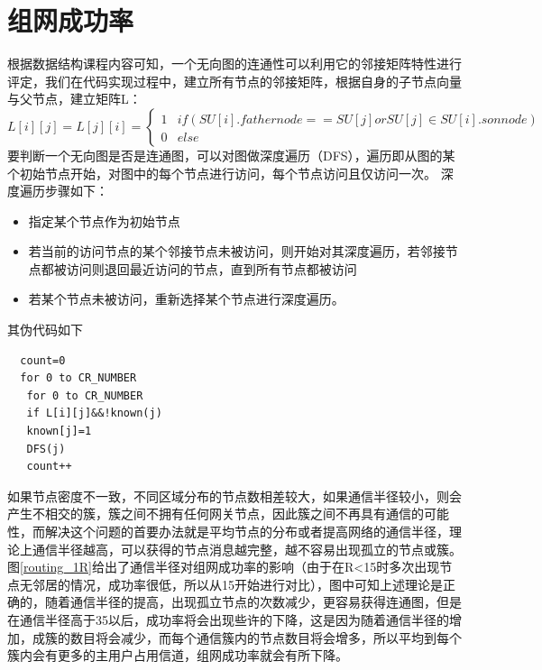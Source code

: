 \documentclass[a4paper,AutoFakeBold,oneside,12pt]{book}
\begin{document}
  \section{组网成功率}
  根据数据结构课程内容可知，一个无向图的连通性可以利用它的邻接矩阵特性进行评定，我们在代码实现过程中，建立所有节点的邻接矩阵，根据自身的子节点向量与父节点，建立矩阵L：
  \begin{equation}
  L[i][j]= L[j][i] =
\left\{  
             \begin{array}{lr}  
             1 &if (SU[i].fathernode==SU[j] or SU[j]\in SU[i].sonnode)  \\  
       
             0 &else
             \end{array}  
\right.  
\end{equation}
  要判断一个无向图是否是连通图，可以对图做深度遍历（DFS）\cite{shujujiegou}，遍历即从图的某个初始节点开始，对图中的每个节点进行访问，每个节点访问且仅访问一次。
  深度遍历步骤如下：
  \begin{itemize}
  \item 指定某个节点作为初始节点
  \item 若当前的访问节点的某个邻接节点未被访问，则开始对其深度遍历，若邻接节点都被访问则退回最近访问的节点，直到所有节点都被访问
  \item 若某个节点未被访问，重新选择某个节点进行深度遍历。
  \end{itemize}
  其伪代码如下
  \begin{lstlisting}
  count=0
  for 0 to CR_NUMBER
   for 0 to CR_NUMBER
   if L[i][j]&&!known(j)
   known[j]=1
   DFS(j)
   count++
\end{lstlisting}
  如果节点密度不一致，不同区域分布的节点数相差较大，如果通信半径较小，则会产生不相交的簇，簇之间不拥有任何网关节点，因此簇之间不再具有通信的可能性，而解决这个问题的首要办法就是平均节点的分布或者提高网络的通信半径，理论上通信半径越高，可以获得的节点消息越完整，越不容易出现孤立的节点或簇。图\ref{routing_1R}给出了通信半径对组网成功率的影响（由于在R<15时多次出现节点无邻居的情况，成功率很低，所以从15开始进行对比），图中可知上述理论是正确的，随着通信半径的提高，出现孤立节点的次数减少，更容易获得连通图，但是在通信半径高于35以后，成功率将会出现些许的下降，这是因为随着通信半径的增加，成簇的数目将会减少，而每个通信簇内的节点数目将会增多，所以平均到每个簇内会有更多的主用户占用信道，组网成功率就会有所下降。
\end{document}
